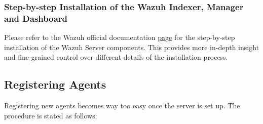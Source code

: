 \subsubsection{Step-by-step Installation of the Wazuh Indexer, Manager and Dashboard}

Please refer to the Wazuh official documentation \href{https://documentation.wazuh.com/current/installation-guide/wazuh-dashboard/step-by-step.html}{page} for the step-by-step installation of the Wazuh Server components. This provides more in-depth insight and fine-grained control over different details of the installation process.

\subsection{Registering Agents}
Registering new agents becomes way too easy once the server is set up. The procedure is stated as follows:

